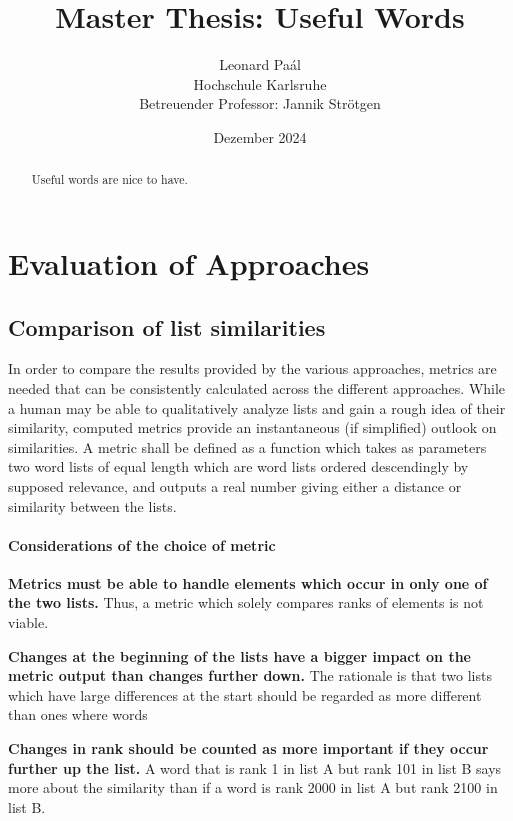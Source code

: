 \documentclass{article}
\title{Master Thesis: Useful Words}
\author{Leonard Paál\\Hochschule Karlsruhe\\Betreuender Professor: Jannik Strötgen}
\date{Dezember 2024}
\begin{document}
\maketitle
\begin{abstract}
	\noindent Useful words are nice to have.
\end{abstract}

\clearpage
\tableofcontents
\clearpage

\section{Evaluation of Approaches}
\subsection{Comparison of list similarities}
In order to compare the results provided by the various approaches, metrics are needed that can be consistently calculated across the different approaches.
While a human may be able to qualitatively analyze lists and gain a rough idea of their similarity, computed metrics provide an instantaneous (if simplified) outlook on similarities.
A metric shall be defined as a function which takes as parameters two word lists of equal length which are word lists ordered descendingly by supposed relevance, and outputs a real number giving either a distance or similarity between the lists.

\paragraph{Considerations of the choice of metric}
\begin{description}
    \item  \textbf{Metrics must be able to handle elements which occur in only one of the two lists.}
        Thus, a metric which solely compares ranks of elements is not viable.
    \item  \textbf{Changes at the beginning of the lists have a bigger impact on the metric output than changes further down.}
        The rationale is that two lists which have large differences at the start should be regarded as more different than ones where words 
    \item  \textbf{Changes in rank should be counted as more important if they occur further up the list.}
        A word that is rank 1 in list A but rank 101 in list B says more about the similarity than if a word is rank 2000 in list A but rank 2100 in list B.
\end{description}
\end{document}
